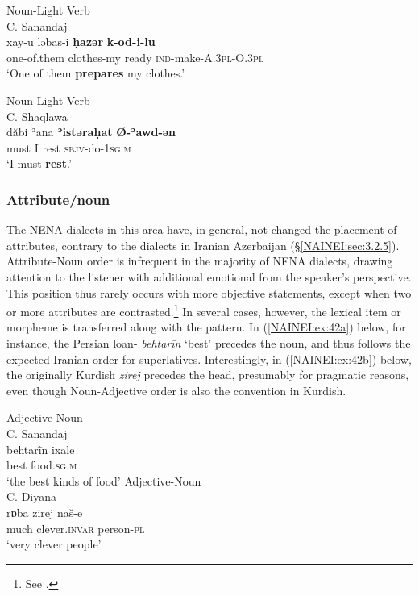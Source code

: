 \documentclass[output=paper,colorlinks,citecolor=brown,draftmode]{langscibook}
\begin{document}
\ea\label{NAINEI:ex:40}
Noun-Light Verb\\
C. Sanandaj \citep[126:\S 16]{Panoussi1990Senaya} \\
\gll xay-u ləbas-i \textbf{ḥazər} \textbf{k-od-i-lu}  \\
     one-of.them clothes-my ready \textsc{ind}-make\textsc{-A.3pl-O.3pl} \\
\glt `One of them \textbf{prepares} my clothes.'
\z

\ea\label{NAINEI:ex:41}
Noun-Light Verb\\
C. Shaqlawa \citep[Text 12:§28]{Khanetal2022FolkloreII} \\
\gll dăbi ʾana \textbf{ʾistəraḥat} \textbf{Ø-ʾawd-ən} \\
     must I rest \textsc{sbjv}-do\textsc{-1sg.m} \\
\glt `I must \textbf{rest}.'
\z

\subsubsection{Attribute/noun}

The NENA dialects in this area have, in general, not changed the placement of attributes, contrary to the dialects in Iranian Azerbaijan (§\ref{NAINEI:sec:3.2.5}). Attribute-Noun order is infrequent in the majority of NENA dialects, drawing attention to the listener with additional emotional  from the speaker's perspective. This position thus rarely occurs with more objective statements, except when two or more attributes are contrasted.\footnote{See \citet[143, 224, 232--233, 246--247, 250, 255]{Gutman2018AttNENA}.}  In several cases, however, the lexical item or morpheme is transferred along with the pattern. In (\ref{NAINEI:ex:42a}) below, for instance, the Persian loan- \textit{behtarīn} `best' precedes the noun, and thus follows the expected Iranian order for superlatives. Interestingly, in (\ref{NAINEI:ex:42b}) below, the originally Kurdish  \textit{zirej} precedes the head, presumably for pragmatic reasons, even though Noun-Adjective order is also the convention in Kurdish.

\ea\label{NAINEI:ex:42}
\ea\label{NAINEI:ex:42a}
Adjective-Noun\\
C. Sanandaj \citep[122:\S 9]{Panoussi1990Senaya} \\
\gll behtarī́n ixale \\
     best food\textsc{.sg.m} \\
\glt `the best kinds of food'
\ex\label{NAINEI:ex:42b}
Adjective-Noun\\
C. Diyana \citep[301]{Napiorkowska2015DiyanaZ} \\
\gll rɒba zirej naš-e \\
     much clever\textsc{.invar} person-\textsc{pl} \\
\glt `very clever people'
\z
\z
\end{document}
